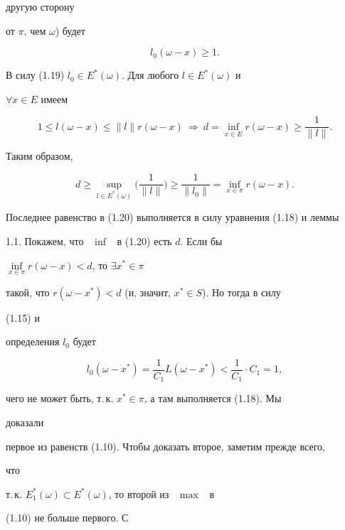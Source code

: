 \begin{pf}
другую сторону 


от $\pi$, чем $\omega$) будет 


\begin{equation} 


l_0(\omega-x)\ge 1.


\end{equation} 


В силу (1.19) $l_0\in E^*(\omega)$. Для любого $l\in E^*(\omega)$ и 


$\forall x\in E$ имеем 


$$ 


1\le l(\omega-x)\le\|l\|r(\omega-x)\ \Longrightarrow \ 


d=\inf_{x\in E}r(\omega-x)\ge\frac{1}{\|l\|}. 


$$ 


Таким образом, 


\begin{equation} 


d\ge\sup_{l\in E^*(\omega)}\bigg(\frac{1}{\|l\|} \bigg)\ge 


\frac{1}{\|l_0\|}=\inf_{x\in\pi}r(\omega-x). 


\end{equation} 


Последнее равенство в (1.20) выполняется в силу уравнения (1.18) и леммы 


1.1. Покажем, что \ $\inf$ \ в (1.20) есть $d$. Если бы 


$\inf\limits_{x\in\pi}r(\omega-x)<d$, то $\exists x^*\in\pi$ 


такой, что $r(\omega-x^*)<d$ (и, значит, $x^*\in S$). Но тогда в силу 


(1.15) и 


определения $l_0$ будет 


$$ 


l_0(\omega-x^*)=\frac{1}{C_1}L(\omega-x^*)< 


\frac{1}{C_1}\cdot C_1=1, 


$$ 


чего не может быть, т.\,к. $x^*\in\pi$, а там выполняется (1.18). Мы 


доказали 


первое из равенств (1.10). Чтобы доказать второе, заметим прежде всего, 


что 


т.\,к. $E^*_1(\omega)\subset E^*(\omega)$, то второй из \ $\max$ \ в 


(1.10) не больше первого. С 



\end{pf}
